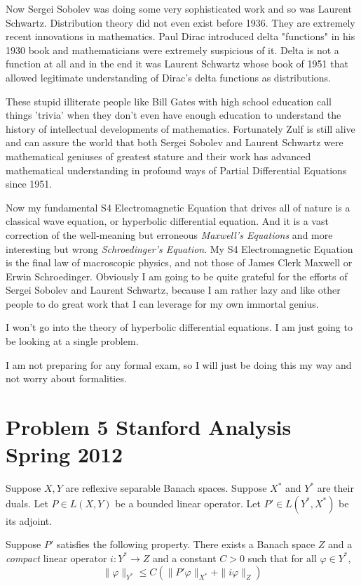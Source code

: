 \documentclass{amsart}
\begin{document}
Now Sergei Sobolev was doing some very sophisticated work and so was Laurent Schwartz.  Distribution theory did not even exist before 1936.  They are extremely recent innovations in mathematics.  Paul Dirac introduced delta "functions" in his 1930 book and mathematicians were extremely suspicious of it.  Delta is not a function at all and in the end it was Laurent Schwartz whose book of 1951 that allowed legitimate understanding of Dirac's delta functions as distributions.

These stupid illiterate people like Bill Gates with high school education call things 'trivia' when they don't even have enough education to understand the history of intellectual developments of mathematics.  Fortunately Zulf is still alive and can assure the world that both Sergei Sobolev and Laurent Schwartz were mathematical geniuses of greatest stature and their work has advanced mathematical understanding in profound ways of Partial Differential Equations since 1951.

Now my fundamental S4 Electromagnetic Equation that drives all of nature is a classical wave equation, or hyperbolic differential equation.  And it is a vast correction of the well-meaning but erroneous {\em Maxwell's Equations} and more interesting but wrong {\em Schroedinger's Equation}.  My S4 Electromagnetic Equation is the final law of macroscopic physics, and not those of James Clerk Maxwell or Erwin Schroedinger.  Obviously I am going to be quite grateful for the efforts of Sergei Sobolev and Laurent Schwartz, because I am rather lazy and like other people to do great work that I can leverage for my own immortal genius.

I won't go into the theory of hyperbolic differential equations.  I am just going to be looking at a single problem.

I am not preparing for any formal exam, so I will just be doing this my way and not worry about formalities.  

\section{Problem 5 Stanford Analysis Spring 2012}

Suppose $X,Y$ are reflexive separable Banach spaces.  Suppose $X^*$ and $Y^*$ are their duals.  Let $P \in L(X,Y)$ be a bounded linear operator.  Let $P' \in L(Y^*, X^*)$ be its adjoint. 

Suppose $P'$ satisfies the following property.  There exists a Banach space $Z$ and a {\em compact} linear operator $i:Y^*\rightarrow Z$ and a constant $C>0$ such that for all $\varphi \in Y^*$,
\[
\| \varphi \|_{Y^*} \le C( \| P' \varphi \|_{X^*} + \| i \varphi \|_Z)
\]
\end{document}
